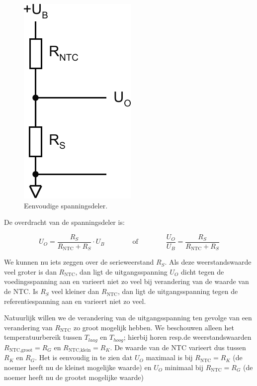 \documentclass[12pt,a4paper,final,twoside,fleqn]{article}
\newcommand{\rntc}{R_\text{NTC}}
\begin{document}
\begin{figure}[ht!]
\centering
\includegraphics[scale=0.63]{drawings/ntc_voltagediv}
\caption{Eenvoudige spanningsdeler.}
\label{fig:ntc_voltagediv}
\end{figure}

De overdracht van de spanningsdeler is:

\begin{equation}
U_O = \dfrac{R_S}{\rntc + R_S}\cdot U_B \qquad\qquad\text{of}\qquad\qquad \dfrac{U_O}{U_B}=\dfrac{R_S}{\rntc + R_S}
\end{equation}

We kunnen nu iets zeggen over de serieweerstand $R_S$. Als deze weerstandswaarde
veel groter is dan $\rntc$, dan ligt de uitgangsspanning $U_O$ dicht tegen de
voedingsspanning aan en varieert niet zo veel bij verandering van de waarde van
de NTC. Is $R_S$ veel kleiner dan $\rntc$, dan ligt de uitgangsspanning tegen
de referentiespanning aan en varieert niet zo veel.

Natuurlijk willen we de verandering van de uitgangsspanning ten gevolge van een
verandering van $\rntc$ zo groot mogelijk hebben. We beschouwen alleen het
temperatuurbereik tussen $T_{laag}$ en $T_{hoog}$; hierbij horen resp.\@ de
weerstandswaarden $R_\text{NTC,groot} = R_G$ en $R_\text{NTC,klein} = R_K$.
De waarde van de NTC varieert dus tussen $R_K$ en $R_G$. Het is eenvoudig in
te zien dat $U_O$ maximaal is bij $\rntc = R_K$ (de noemer heeft nu de kleinst
mogelijke waarde) en $U_O$ minimaal bij $\rntc = R_G$ (de noemer heeft nu de
grootst mogelijke waarde)
\end{document}
